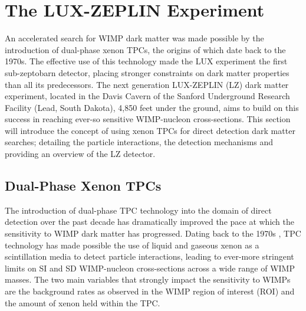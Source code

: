 \chapter{The LUX-ZEPLIN Experiment}
\label{chap:chap2}

An accelerated search for WIMP dark matter was made possible by the introduction of dual-phase xenon TPCs, the origins of which date back to the 1970s. The effective use of this technology made the LUX experiment the first sub-zeptobarn detector, placing stronger constraints on dark matter properties than all its predecessors. The next generation LUX-ZEPLIN (LZ) dark matter experiment, located in the Davis Cavern of the Sanford Underground Research Facility (Lead, South Dakota), 4,850 feet under the ground, aims to build on this success in reaching ever-so sensitive WIMP-nucleon cross-sections. This section will introduce the concept of using xenon TPCs for direct detection dark matter searches; detailing the particle interactions, the detection mechanisms and providing an overview of the LZ detector.


\section{Dual-Phase Xenon TPCs}
\label{sec:dualphaseTPC}

The introduction of dual-phase TPC technology into the domain of direct detection over the past decade has dramatically improved the pace at which the sensitivity to WIMP dark matter has progressed. Dating back to the 1970s \cite{tpc_technology}, TPC technology has made possible the use of liquid and gaseous xenon as a scintillation media to detect particle interactions, leading to ever-more stringent limits on SI and SD WIMP-nucleon cross-sections across a wide range of WIMP masses. The two main variables that strongly impact the sensitivity to WIMPs are the background rates as observed in the WIMP region of interest (ROI) and the amount of xenon held within the TPC.

